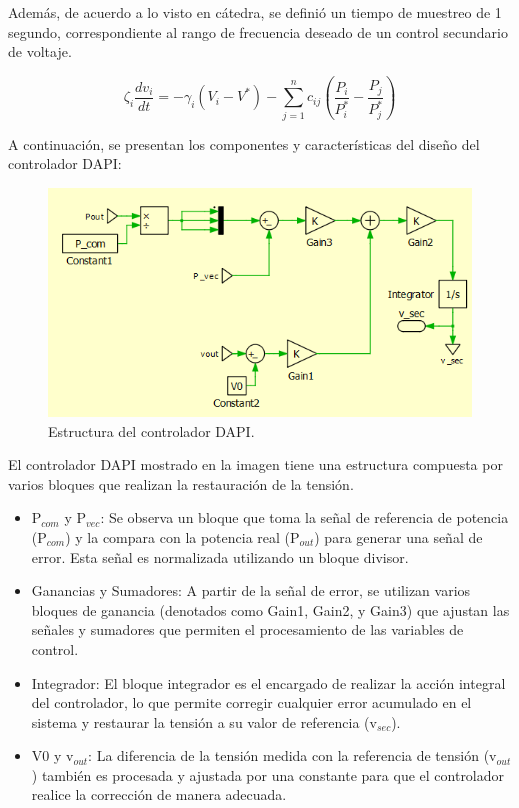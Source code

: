 Además, de acuerdo a lo visto en cátedra, se definió un tiempo de muestreo de 1 segundo, correspondiente al rango de frecuencia deseado de un control secundario de voltaje.

\begin{equation}
    \zeta_i \frac{dv_i}{dt} = -\gamma_i \left( V_i - V^* \right) - \sum_{j=1}^{n} c_{ij} \left( \frac{P_i}{P_i^*} - \frac{P_j}{P_j^*} \right)
    \label{controlador_dapi_tension}
\end{equation}

A continuación, se presentan los componentes y características del diseño del controlador DAPI:

\begin{figure}
    \centering
    \includegraphics[width=1.0\linewidth]{Tarea 2/report/imagenes/p2a/estructura_dapi.png}
    \caption{Estructura del controlador DAPI.}
    \label{estructura_dapi}
\end{figure}

El controlador DAPI mostrado en la imagen tiene una estructura compuesta por varios bloques que realizan la restauración de la tensión.

\begin{itemize}
    \item P$_{com}$ y P$_{vec}$: Se observa un bloque que toma la señal de referencia de potencia (P$_{com}$) y la compara con la potencia real (P$_{out}$) para generar una señal de error. Esta señal es normalizada utilizando un bloque divisor.
    \item Ganancias y Sumadores: A partir de la señal de error, se utilizan varios bloques de ganancia (denotados como Gain1, Gain2, y Gain3) que ajustan las señales y sumadores que permiten el procesamiento de las variables de control.
    \item Integrador: El bloque integrador es el encargado de realizar la acción integral del controlador, lo que permite corregir cualquier error acumulado en el sistema y restaurar la tensión a su valor de referencia (v$_{sec}$).
    \item V0 y v$_{out}$: La diferencia de la tensión medida con la referencia de tensión (v$_{out}$) también es procesada y ajustada por una constante para que el controlador realice la corrección de manera adecuada.
\end{itemize}


